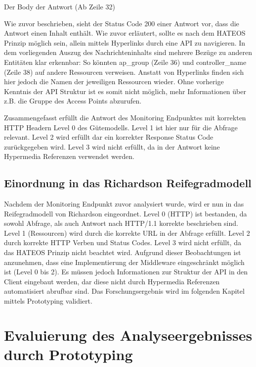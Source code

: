 Der Body der Antwort (Ab Zeile 32)

Wie zuvor beschrieben, sieht der Status Code 200 einer Antwort vor, dass die Antwort einen Inhalt enthält. Wie zuvor erläutert, sollte es nach dem HATEOS Prinzip möglich sein, allein mittels Hyperlinks durch eine API zu navigieren. In dem vorliegenden Auszug des Nachrichteninhalts sind mehrere Bezüge zu anderen Entitäten klar erkennbar: So könnten ap\_group (Zeile 36) und controller\_name (Zeile 38) auf andere Ressourcen verweisen. Anstatt von Hyperlinks finden sich hier jedoch die Namen der jeweiligen Ressourcen wieder. Ohne vorherige Kenntnis der API Struktur ist es somit nicht möglich, mehr Informationen über z.B. die Gruppe des Access Points abzurufen.

Zusammengefasst erfüllt die Antwort des Monitoring Endpunktes mit korrekten HTTP Headern Level 0 des Gütemodells. Level 1 ist hier nur für die Abfrage relevant. Level 2 wird erfüllt dar ein korrekter Response Status Code zurückgegeben wird. Level 3 wird nicht erfüllt, da in der Antwort keine Hypermedia Referenzen verwendet werden.

\subsection{Einordnung in das Richardson Reifegradmodell}\label{subsection:einordnung-in-das-richardson-reifegradmodell}

Nachdem der Monitoring Endpunkt zuvor analysiert wurde, wird er nun in das Reifegradmodell von Richardson eingeordnet. Level 0 (HTTP) ist bestanden, da sowohl Abfrage, als auch Antwort nach HTTP/1.1 korrekte beschrieben sind. Level 1 (Ressourcen) wird durch die korrekte URL in der Abfrage erfüllt. Level 2 durch korrekte HTTP Verben und Status Codes. Level 3 wird nicht erfüllt, da das HATEOS Prinzip nicht beachtet wird. Aufgrund dieser Beobachtungen ist anzunehmen, dass eine Implementierung der Middleware eingeschränkt möglich ist (Level 0 bis 2). Es müssen jedoch Informationen zur Struktur der API in den Client eingebaut werden, dar diese nicht durch Hypermedia Referenzen automatisiert abrufbar sind. Das Forschungsergebnis wird im folgenden Kapitel mittels Prototyping validiert.

\section{Evaluierung des Analyseergebnisses durch Prototyping}\label{section:Evaluierung-des-Analyseergebnisses-durch-Prototyping}

